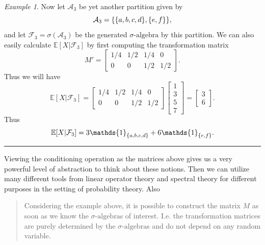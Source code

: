 \documentclass[11pt,a4paper]{article}
\theoremstyle{definition}
\theoremstyle{remark}
\newtheorem{example}{Example}
\newcommand{\E}{\mathbb{E}}
\begin{document}
\begin{example}
		Now let $ \mathcal{A}_3 $ be yet another partition given by
		\[ \mathcal{A}_3 = \{\{a,b,c,d\},\{e,f\}\}, \]
		and let $ \mathcal{F}_3 = \sigma(\mathcal{A}_3) $ be the generated $\sigma\text{-algebra}$ by this partition. We can also easily calculate $ \E[X|\mathcal{F}_3] $ by first computing the transformation matrix
		\[ M' = \begin{bmatrix}
			1/4 & 1/2 & 1/4 & 0 \\
			0 & 0 & 1/2 & 1/2
		\end{bmatrix}. \]
		Thus we will have
		\[ \E[X|\mathcal{F}_3] = \begin{bmatrix}
			1/4 & 1/2 & 1/4 & 0 \\
			0 & 0 & 1/2 & 1/2
		\end{bmatrix}
		\begin{bmatrix}
			1 \\ 3 \\ 5 \\ 7
		\end{bmatrix}
		= 
		\begin{bmatrix}
			3 \\ 6
		\end{bmatrix}.
		 \]  
		 Thus
		 \[ \E[X|\mathcal{F}_3] = 3 \mathds{1}_{\set{a,b,c,d}} + 6 \mathds{1}_{\set{e,f}}. \]
	\end{example}
	\hrule
	\vspace{5pt}
	
	Viewing the conditioning operation as the matrices above gives us a very powerful level of abstraction to think about these notions. Then we can utilize many different tools from linear operator theory and spectral theory for different purposes in the setting of probability theory. Also
	\begin{quote}
		Considering the example above, it is possible to construct the matrix $ M $ as soon as we know the $\sigma\text{-algebra}$s of interest. I.e. the transformation matrices are purely determined by the $\sigma\text{-algebra}$s and do not depend on any random variable.
	\end{quote}
	
\end{document}
